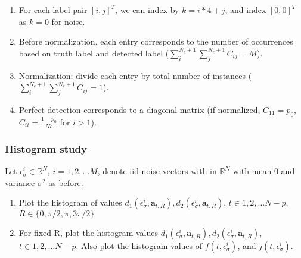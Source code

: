 \documentclass[11pt]{article}
\newcommand{\ba}{\boldsymbol{a}}
\begin{document}
\begin{itemize}
    \begin{enumerate}
        \item For each label pair $[i,j]^T$, we can index by $k=i*4+j$, and index $[0,0]^T$ as $k=0$ for noise.
        \item Before normalization, each entry corresponds to the number of occurrences based on truth label and detected label ($\sum_{i}^{N_c+1}\sum_{j}^{N_c+1} C_{ij} = M$).
        \item Normalization: divide each entry by total number of instances ($\sum_{i}^{N_c+1}\sum_{j}^{N_c+1} C_{ij} = 1$).
        \item Perfect detection corresponds to a diagonal matrix (if normalized, $C_{11}=p_0$, $C_{ii}=\frac{1-p_0}{Nc}$ for $i>1$).
        
    \end{enumerate}
    
\end{itemize}

\subsubsection{Histogram study}
Let $\epsilon_{\sigma}^{i}  \in \mathbb{R}^{N}$, $i=1,2,\ldots M$, denote iid noise vectors with in $\mathbb{R}^{N}$ with mean $0$ and variance $\sigma^2$ as before. 

\begin{enumerate}
\item Plot the histogram of values $d_{1}(\epsilon_{\sigma}^i, \ba_{t,R}), d_{2}(\epsilon_{\sigma}^i, \ba_{t,R})$, $t\in 1,2,\ldots N-p$, $R \in \{ 0,\pi/2, \pi, 3\pi/2 \}$
\item For fixed R, plot the histogram values $d_{1}(\epsilon_{\sigma}^i, \ba_{t,R}), d_{2}(\epsilon_{\sigma}^i, \ba_{t,R})$, $t\in 1,2,\ldots N-p$. Also plot the histogram values of $f(t,\epsilon_{\sigma}^i)$, and $j(t,\epsilon_{\sigma}^i)$.
\end{enumerate}
\end{document}
